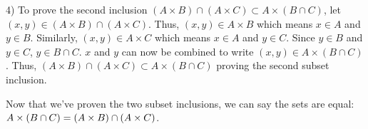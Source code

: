 \begin{paragraph}{4)}
        To prove the second inclusion $(A \times B) \cap (A \times C) \subset A \times (B \cap C)$,
        let $(x, y) \in (A \times B) \cap (A \times C)$. Thus, $(x, y) \in A \times B$
        which means $x \in A$ and $y \in B$. Similarly, $(x, y) \in A \times C$ which
        means $x \in A$ and $y \in C$. Since $y \in B$ and $y \in C$, $y \in B \cap C$.
        $x$ and $y$ can now be combined to write $(x, y) \in A \times (B \cap C)$.
        Thus, $(A \times B) \cap (A \times C) \subset A \times (B \cap C)$ proving the second
        subset inclusion.
        \spacing
        
        Now that we've proven the two subset inclusions, we can say the sets are equal:
        $A \times (B \cap C) = (A \times B) \cap \\(A \times C)$.
        \proofEnd
    \end{paragraph}

    \bigskip
    \pagebreak

